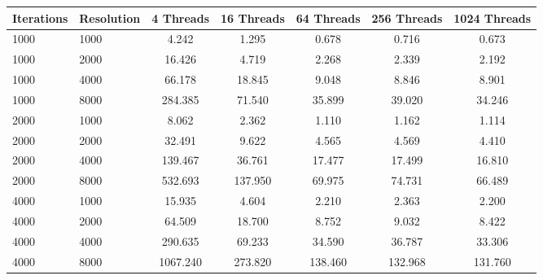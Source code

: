 \begin{tabular}{llccccc}
	\toprule
	Iterations & Resolution & 4 Threads & 16 Threads & 64 Threads & 256 Threads & 1024 Threads \\
	\midrule
	1000       & 1000       & 4.242     & 1.295      & 0.678      & 0.716       & 0.673        \\
	1000       & 2000       & 16.426    & 4.719      & 2.268      & 2.339       & 2.192        \\
	1000       & 4000       & 66.178    & 18.845     & 9.048      & 8.846       & 8.901        \\
	1000       & 8000       & 284.385   & 71.540     & 35.899     & 39.020      & 34.246       \\
	2000       & 1000       & 8.062     & 2.362      & 1.110      & 1.162       & 1.114        \\
	2000       & 2000       & 32.491    & 9.622      & 4.565      & 4.569       & 4.410        \\
	2000       & 4000       & 139.467   & 36.761     & 17.477     & 17.499      & 16.810       \\
	2000       & 8000       & 532.693   & 137.950    & 69.975     & 74.731      & 66.489       \\
	4000       & 1000       & 15.935    & 4.604      & 2.210      & 2.363       & 2.200        \\
	4000       & 2000       & 64.509    & 18.700     & 8.752      & 9.032       & 8.422        \\
	4000       & 4000       & 290.635   & 69.233     & 34.590     & 36.787      & 33.306       \\
	4000       & 8000       & 1067.240  & 273.820    & 138.460    & 132.968     & 131.760      \\
	\bottomrule
\end{tabular}
